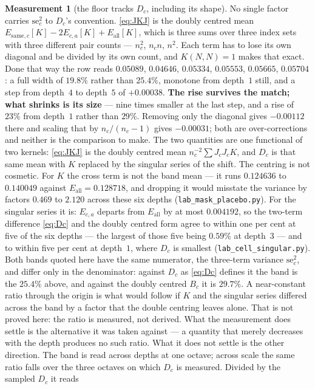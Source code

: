 \documentclass[11pt,a4paper]{article}
\theoremstyle{plain}
\theoremstyle{definition}
\newtheorem{measurement}[theorem]{Measurement}
\theoremstyle{remark}
\begin{document}
\begin{measurement}[the floor tracks $D_c$, including its shape]
No single factor carries $\mathrm{se}_c^2$ to $D_c$'s convention.
\eqref{eq:JKJ} is the
doubly centred mean $E_{\mathrm{same},c}[K]-2E_{c,a}[K]+E_{\mathrm{all}}[K]$,
which is three sums over three index sets with three different pair
counts --- $n_c^2$, $n_cn$, $n^2$. Each term has to lose its own
diagonal and be divided by its own count, and $K(N,N)=1$ makes that
exact. Done that way the row reads $0.05089$, $0.04646$, $0.05334$,
$0.05553$, $0.05665$, $0.05704$: a full width of $19.8\%$ rather than
$25.4\%$, monotone from depth~$1$ still, and a step from depth~$4$ to
depth~$5$ of $+0.00038$. \textbf{The rise survives the match; what
shrinks is its size} --- nine times smaller at the last step, and a
rise of $23\%$ from depth~$1$ rather than $29\%$. Removing only the
diagonal gives $-0.00112$ there and scaling that by $n_c/(n_c-1)$
gives $-0.00031$; both are over-corrections and neither is the
comparison to make. The two quantities
are one functional of two kernels: \eqref{eq:JKJ} is the doubly
centred mean $n_c^{-2}\sum J_cJ_cK$, and $D_c$ is that same mean with
$K$ replaced by the singular series of the shift. The centring is not
cosmetic. For $K$ the cross term is not the band mean --- it runs
$0.124636$ to $0.140049$ against $E_{\mathrm{all}}=0.128718$, and
dropping it would misstate the variance by factors $0.469$ to $2.120$
across these six depths (\texttt{lab\_mask\_placebo.py}). For the
singular series it is: $E_{c,a}$ departs from $E_{\mathrm{all}}$ by at
most $0.004192$, so the two-term difference \eqref{eq:Dc} and the
doubly centred form agree to within one per cent at five of the six
depths --- the largest of those five being $0.59\%$ at depth~$3$ ---
and to within five per cent at depth~$1$, where $D_c$ is
smallest (\texttt{lab\_cell\_singular.py}). Both bands quoted here have
the same numerator, the three-term variance $\mathrm{se}_c^2$, and
differ only in the denominator: against $D_c$ as \eqref{eq:Dc} defines
it the band is the $25.4\%$ above, and against the doubly centred
$B_c$ it is $29.7\%$.
A near-constant ratio through the origin is what would follow if $K$
and the singular series differed across the band by a factor that the
double centring leaves alone. That is not proved here: the ratio is
measured, not derived. What the measurement does settle is the
alternative it was taken against --- a quantity that merely decreases
with the depth produces no such ratio. What it does not settle
is the other direction. The band is read across depths at one
octave; across scale the same ratio falls over the three octaves on
which $D_c$ is measured. Divided by the sampled $D_c$ it reads

\end{measurement}
\end{document}
